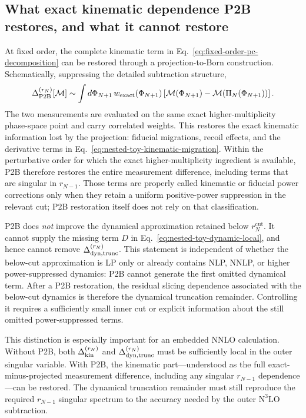 \documentclass[11pt]{article}
\newcommand{\rnm}{r_{N-1}}
\newcommand{\rn}{r_N}
\newcommand{\cut}{\mathrm{cut}}
\newcommand{\Ph}{\Phi}
\newcommand{\Mcal}{\mathcal{M}}
\begin{document}
\subsection{What exact kinematic dependence P2B restores, and what it cannot restore}
\label{subsec:p2b-scope}

At fixed order, the complete kinematic term in Eq.~\eqref{eq:fixed-order-pc-decomposition} can be restored
through a projection-to-Born construction. Schematically, suppressing the detailed subtraction structure,
\begin{equation}
\Delta_{\rm P2B}^{(\rn)}[\Mcal]
\sim
\int d\Ph_{N+1}\,
w_{\rm exact}(\Ph_{N+1})
\left[
\Mcal(\Ph_{N+1})-
\Mcal\!\left(\Pi_N(\Ph_{N+1})\right)
\right].
\label{eq:p2b-fpc-correlated}
\end{equation}
The two measurements are evaluated on the same exact higher-multiplicity phase-space point and carry
correlated weights. This restores the exact kinematic information lost by the projection: fiducial migrations,
recoil effects, and the derivative terms in Eq.~\eqref{eq:nested-toy-kinematic-migration}. Within the
perturbative order for which the exact higher-multiplicity ingredient is available, P2B therefore restores
the entire measurement difference, including terms that are singular in $\rnm$. Those terms are properly
called kinematic or fiducial power corrections only when they retain a uniform positive-power suppression in
the relevant cut; P2B restoration itself does not rely on that classification.

P2B does \emph{not} improve the dynamical approximation retained below $\rn^{\cut}$. It cannot supply the
missing term $D$ in Eq.~\eqref{eq:nested-toy-dynamic-local}, and hence cannot remove
$\Delta_{\rm dyn,trunc}^{(\rn)}$. This statement is independent of whether the below-cut approximation is LP
only or already contains NLP, NNLP, or higher power-suppressed dynamics: P2B cannot generate the first omitted
dynamical term. After a P2B restoration, the residual slicing dependence associated with the below-cut
dynamics is therefore the dynamical truncation remainder. Controlling it requires a sufficiently small inner
cut or explicit information about the still omitted power-suppressed terms.

This distinction is especially important for an embedded NNLO calculation. Without P2B, both
$\Delta_{\rm kin}^{(\rn)}$ and $\Delta_{\rm dyn,trunc}^{(\rn)}$ must be sufficiently local in the outer
singular variable. With P2B, the kinematic part---understood as the full exact-minus-projected measurement
difference, including any singular $\rnm$ dependence---can be restored. The dynamical truncation remainder
must still reproduce the required $\rnm$ singular spectrum to the accuracy needed by the outer
$\mathrm{N}^3\mathrm{LO}$ subtraction.
\end{document}
